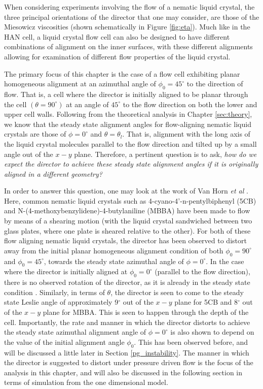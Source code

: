 When considering experiments involving the flow of a nematic liquid crystal, the three principal orientations of the director that one may consider, are those of the Miesowicz viscosities (shown schematically in Figure \ref{fig:eta}). Much like in the HAN cell, a liquid crystal flow cell can also be designed to have different combinations of alignment on the inner surfaces, with these different alignments allowing for examination of different flow properties of the liquid crystal. 

The primary focus of this chapter is the case of a flow cell exhibiting planar homogeneous alignment at an azimuthal angle of $\phi_0=45^{\circ}$ to the direction of flow. That is, a cell where the director is initially aligned to be planar through the cell $\left(\theta=90^{\circ}\right)$ at an angle of $45^{\circ}$ to the flow direction on both the lower and upper cell walls. Following from the theoretical analysis in Chapter \ref{sec:theory}, we know that the steady state alignment angles for flow-aligning nematic liquid crystals are those of $\phi=0^{\circ}$ and $\theta=\theta_l$. That is, alignment with the long axis of the liquid crystal molecules parallel to the flow direction and tilted up by a small angle out of the $x-y$ plane. Therefore, a pertinent question is to ask, \textit{how do we expect the director to achieve these steady state alignment angles if it is originally aligned in a different geometry?}

In order to answer this question, one may look at the work of Van Horn \textit{et al} \cite{Boudreau1999,Horn2003,VanHorn2000}. Here, common nematic liquid crystals such as 4-cyano-4'-n-pentylbiphenyl (5CB) and N-(4-methoxybenzylidene)-4-butylaniline (MBBA) have been made to flow by means of a shearing motion (with the liquid crystal sandwiched between two glass plates, where one plate is sheared relative to the other). For both of these flow aligning nematic liquid crystals, the director has been observed to distort away from the initial planar homogeneous alignment condition of both $\phi_0=90^{\circ}$ and $\phi_0=45^{\circ}$, towards the steady state azimuthal angle of $\phi=0^{\circ}$. In the case where the director is initially aligned at $\phi_0=0^{\circ}$ (parallel to the flow direction), there is no observed rotation of the director, as it is already in the steady state condition \cite{Boudreau1999}. Similarly, in terms of $\theta$, the director is seen to come to the steady state Leslie angle of approximately 9$^{\circ}$ out of the $x-y$ plane for 5CB and 8$^{\circ}$ out of the $x-y$ plane for MBBA. This is seen to happen through the depth of the cell. Importantly, the rate and manner in which the director distorts to achieve the steady state azimuthal alignment angle of $\phi=0^{\circ}$ is also shown to depend on the value of the initial alignment angle $\phi_0$. This has been observed before, and will be discussed a little later in Section \ref{pg_instability}. The manner in which the director is suggested to distort under pressure driven flow is the focus of the analysis in this chapter, and will also be discussed in the following section in terms of simulation from the one dimensional model.

